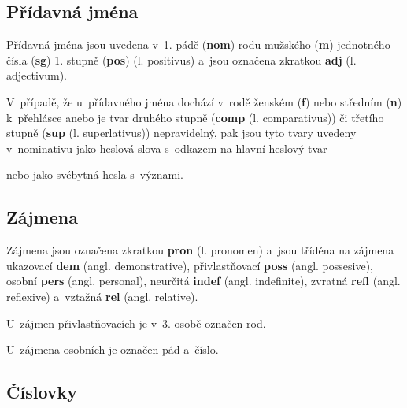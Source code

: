 \blspace
  \dicEntry {} 
  \dicEntry {} 
\blspace

\subsection*{Přídavná jména}

Přídavná jména jsou uvedena v~1. pádě (\textbf{nom}) rodu mužského (\textbf{m}) jednotného čísla (\textbf{sg}) 1. stupně (\textbf{pos}) (l. positivus) a~jsou označena zkratkou \textbf{adj} (l. adjectivum).

\blspace
  \dicEntry {} 
\blspace

V~případě, že u~přídavného jména dochází v~rodě ženském (\textbf{f}) nebo středním (\textbf{n}) k~přehlásce anebo je tvar druhého stupně (\textbf{comp} (l. comparativus)) či třetího stupně (\textbf{sup} (l. superlativus)) nepravidelný, pak jsou tyto tvary uvedeny v~nominativu jako heslová slova s~odkazem na hlavní heslový tvar

\blspace
  \dicEntry {}   
\blspace

nebo jako svébytná hesla s~význami.

\blspace
  \dicEntry {}  
\blspace

\subsection*{Zájmena}

Zájmena jsou označena zkratkou \textbf{pron} (l. pronomen) a~jsou tříděna na zájmena ukazovací \textbf{dem} (angl. demonstrative), přivlastňovací \textbf{poss} (angl. possesive), osobní \textbf{pers} (angl. personal), neurčitá \textbf{indef} (angl. indefinite), zvratná \textbf{refl} (angl. reflexive) a~vztažná \textbf{rel} (angl. relative).

\blspace
  \dicEntry {}  
\blspace

U~zájmen přivlastňovacích je v~3. osobě označen rod.

\blspace
  \dicEntry {}  
\blspace

U~zájmena osobních je označen pád a~číslo.

\blspace
  \dicEntry {}  
\blspace

\subsection*{Číslovky}

